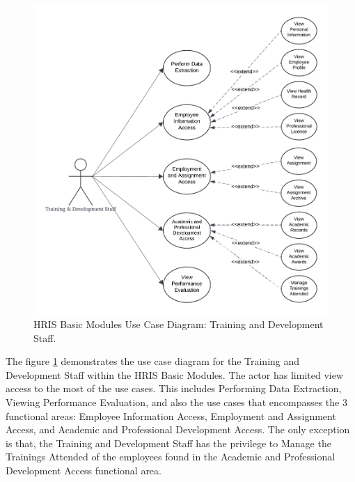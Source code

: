    \begin{figure}[H]
        \centering
        \includegraphics[width=0.9\linewidth]{figures/images/use-case-basic-5.png}
        \caption{HRIS Basic Modules Use Case Diagram: Training and Development Staff.}
        \label{fig:use-case-basic-5}
    \end{figure}
    
    The figure \ref{fig:use-case-basic-5} demonstrates the use case diagram for the Training and Development Staff within the HRIS Basic Modules. The actor has limited view access to the most of the use cases. This includes Performing Data Extraction, Viewing Performance Evaluation, and also the use cases that  encompasses the 3 functional areas: Employee Information Access, Employment and Assignment Access, and Academic and Professional Development Access. The only exception is that, the Training and Development Staff has the privilege to Manage the Trainings Attended of the employees found in the Academic and Professional Development Access functional area.

